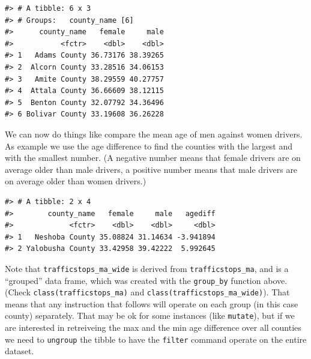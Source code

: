 \documentclass[]{book}
\newenvironment{Shaded}{\begin{snugshade}}{\end{snugshade}}
\newcommand{\KeywordTok}[1]{\textcolor[rgb]{0.13,0.29,0.53}{\textbf{#1}}}
\newcommand{\DataTypeTok}[1]{\textcolor[rgb]{0.13,0.29,0.53}{#1}}
\newcommand{\StringTok}[1]{\textcolor[rgb]{0.31,0.60,0.02}{#1}}
\newcommand{\OperatorTok}[1]{\textcolor[rgb]{0.81,0.36,0.00}{\textbf{#1}}}
\newcommand{\NormalTok}[1]{#1}
\theoremstyle{definition}
\theoremstyle{definition}
\theoremstyle{definition}
\theoremstyle{remark}
\begin{document}
\begin{verbatim}
#> # A tibble: 6 x 3
#> # Groups:   county_name [6]
#>      county_name   female     male
#>           <fctr>    <dbl>    <dbl>
#> 1   Adams County 36.73176 38.39265
#> 2  Alcorn County 33.28516 34.06153
#> 3   Amite County 38.29559 40.27757
#> 4  Attala County 36.66609 38.12115
#> 5  Benton County 32.07792 34.36496
#> 6 Bolivar County 33.19608 36.26228
\end{verbatim}

We can now do things like compare the mean age of men against women
drivers. As example we use the age difference to find the counties with
the largest and with the smallest number. (A negative number means that
female drivers are on average older than male drivers, a positive number
means that male drivers are on average older than women drivers.)

\begin{Shaded}
\end{Shaded}

\begin{verbatim}
#> # A tibble: 2 x 4
#>        county_name   female     male   agediff
#>             <fctr>    <dbl>    <dbl>     <dbl>
#> 1   Neshoba County 35.08824 31.14634 -3.941894
#> 2 Yalobusha County 33.42958 39.42222  5.992645
\end{verbatim}

Note that \texttt{trafficstops\_ma\_wide} is derived from
\texttt{trafficstops\_ma}, and is a ``grouped'' data frame, which was
created with the \texttt{group\_by} function above. (Check
\texttt{class(trafficstops\_ma)} and
\texttt{class(trafficstops\_ma\_wide)}). That means that any instruction
that follows will operate on each group (in this case county)
separately. That may be ok for some instances (like \texttt{mutate}),
but if we are interested in retreiveing the max and the min age
difference over all counties we need to \texttt{ungroup} the tibble to
have the \texttt{filter} command operate on the entire dataset.
\end{document}
